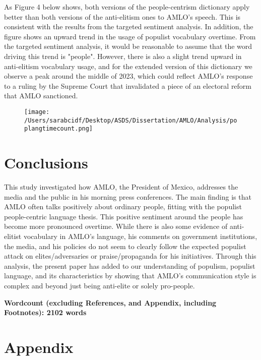 \documentclass[]{article}
\begin{document}
As Figure 4 below shows, both versions of the people-centrism dictionary apply better than both versions of the anti-elitism ones to AMLO's speech. This is consistent with the results from the targeted sentiment analysis. In addition, the figure shows an upward trend in the usage of populist vocabulary overtime. From the targeted sentiment analysis, it would be reasonable to assume that the word driving this trend is "people". However, there is also a slight trend upward in anti-elitism vocabulary usage, and for the extended version of this dictionary we observe a peak around the middle of 2023, which could reflect AMLO's response to a ruling by the Supreme Court that invalidated a piece of an electoral reform that AMLO sanctioned. 

\begin{figure}[H]
	\centering
	\caption{\label{}}
	\texttt{[image: /Users/sarabcidf/Desktop/ASDS/Dissertation/AMLO/Analysis/poplangtimecount.png]}
\end{figure}

\section{Conclusions}

This study investigated how AMLO, the President of Mexico, addresses the media and the public in his morning press conferences. The main finding is that AMLO often talks positively about ordinary people, fitting with the populist people-centric language thesis. This positive sentiment around the people has become more pronounced overtime. While there is also some evidence of anti-elitist vocabulary in AMLO's language, his comments on government institutions, the media, and his policies do not seem to clearly follow the expected populist attack on elites/adversaries or praise/propaganda for his initiatives. Through this analysis, the present paper has added to our understanding of populism, populist language, and its characteristics by showing that AMLO's communication style is complex and beyond just being anti-elite or solely pro-people. 

\vspace{1cm}
\noindent \textbf{Wordcount (excluding References, and Appendix, including Footnotes): 2102 words}
\vspace{1cm}




\vspace{.5cm}
\section{Appendix}
\end{document}
